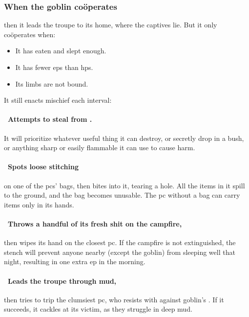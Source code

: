 \documentclass[10pt,twoside]{book}
\begin{document}
\subsubsection{When the goblin co\"operates}
then it leads the troupe to its home, where the captives lie.
But it only co\"operates when:

\begin{itemize}
  \item
  It has eaten and slept enough.
  \item
  It has fewer \glspl{ep} than \glspl{hp}.
  \item
  Its limbs are not bound.
\end{itemize}

It still enacts mischief each \gls{interval}:

\paragraph{\Square~Attempts to steal from .}
It will prioritize whatever useful thing it can destroy, or secretly drop in a bush, or anything sharp or easily flammable it can use to cause harm.

\paragraph{\Square~Spots loose stitching}
on one of the \glspl{pc}' bags, then bites into it, tearing a hole.
All the items in it spill to the ground, and the bag becomes unusable.
The \gls{pc} without a bag can carry items only in its hands.

\paragraph{\Square~Throws a handful of its fresh shit on the campfire,}
then wipes its hand on the closest \gls{pc}.
If the campfire is not extinguished, the stench will prevent anyone nearby (except the goblin) from sleeping well that night, resulting in one extra \gls{ep} in the morning.

\paragraph{\Square~Leads the troupe through mud,}
then tries to trip the clumsiest \gls{pc}, who resists with  against goblin's .
If it succeeds, it cackles at its victim, as they struggle in deep mud.
\end{document}
